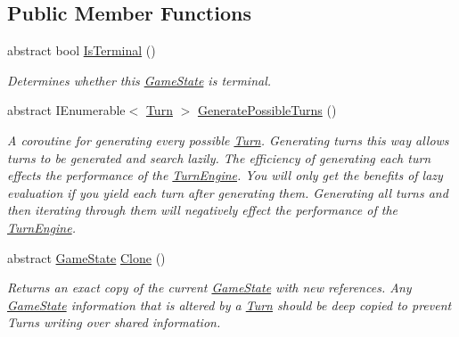 \subsection*{Public Member Functions}
\begin{DoxyCompactItemize}
\item 
abstract bool \hyperlink{class_universal_turn_based_a_i_1_1_game_state_a2d877d322bd57b7c6962d09b20baeebb}{Is\+Terminal} ()
\begin{DoxyCompactList}\small\item\em Determines whether this \hyperlink{class_universal_turn_based_a_i_1_1_game_state}{Game\+State} is terminal. \end{DoxyCompactList}\item 
abstract I\+Enumerable$<$ \hyperlink{class_universal_turn_based_a_i_1_1_turn}{Turn} $>$ \hyperlink{class_universal_turn_based_a_i_1_1_game_state_a252554bfd9fd58bdc06bd6f49b716240}{Generate\+Possible\+Turns} ()
\begin{DoxyCompactList}\small\item\em A coroutine for generating every possible \hyperlink{class_universal_turn_based_a_i_1_1_turn}{Turn}. Generating turns this way allows turns to be generated and search lazily. The efficiency of generating each turn effects the performance of the \hyperlink{class_universal_turn_based_a_i_1_1_turn_engine}{Turn\+Engine}. You will only get the benefits of lazy evaluation if you yield each turn after generating them. Generating all turns and then iterating through them will negatively effect the performance of the \hyperlink{class_universal_turn_based_a_i_1_1_turn_engine}{Turn\+Engine}. \end{DoxyCompactList}\item 
abstract \hyperlink{class_universal_turn_based_a_i_1_1_game_state}{Game\+State} \hyperlink{class_universal_turn_based_a_i_1_1_game_state_a7e9d117069df3da5b42eeadecf33a326}{Clone} ()
\begin{DoxyCompactList}\small\item\em Returns an exact copy of the current \hyperlink{class_universal_turn_based_a_i_1_1_game_state}{Game\+State} with new references. Any \hyperlink{class_universal_turn_based_a_i_1_1_game_state}{Game\+State} information that is altered by a \hyperlink{class_universal_turn_based_a_i_1_1_turn}{Turn} should be deep copied to prevent Turns writing over shared information. \end{DoxyCompactList}\end{DoxyCompactItemize}


